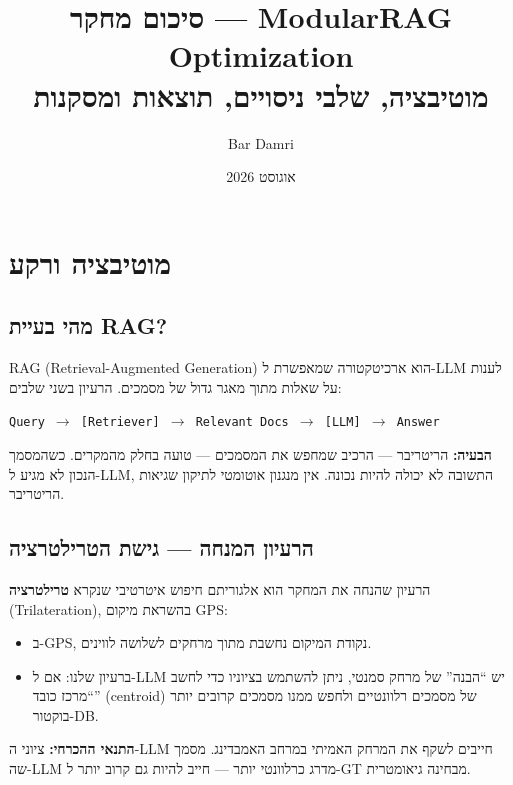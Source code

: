 \documentclass[12pt, a4paper]{article}
\title{%
  \textbf{סיכום מחקר --- ModularRAG Optimization}\\[0.5em]
  \large מוטיבציה, שלבי ניסויים, תוצאות ומסקנות
}
\author{Bar Damri}
\date{אוגוסט 2026}
\begin{document}
\maketitle
\tableofcontents
\newpage

\section{מוטיבציה ורקע}

\subsection{מהי בעיית RAG?}

\textenglish{RAG (Retrieval-Augmented Generation)} הוא ארכיטקטורה שמאפשרת ל-\textenglish{LLM} לענות על שאלות מתוך מאגר גדול של מסמכים. הרעיון בשני שלבים:

\begin{english}
\begin{center}
\texttt{Query\ $\to$\ [Retriever]\ $\to$\ Relevant Docs\ $\to$\ [LLM]\ $\to$\ Answer}
\end{center}
\end{english}

\textbf{הבעיה:} הריטריבר --- הרכיב שמחפש את המסמכים --- טועה בחלק מהמקרים. כשהמסמך הנכון לא מגיע ל-\textenglish{LLM}, התשובה לא יכולה להיות נכונה. אין מנגנון אוטומטי לתיקון שגיאות הריטריבר.

\subsection{הרעיון המנחה --- גישת הטרילטרציה}

הרעיון שהנחה את המחקר הוא אלגוריתם חיפוש איטרטיבי שנקרא \textbf{טרילטרציה} (\textenglish{Trilateration}), בהשראת מיקום \textenglish{GPS}:

\begin{itemize}
  \item ב-\textenglish{GPS}, נקודת המיקום נחשבת מתוך מרחקים לשלושה לווינים.
  \item ברעיון שלנו: אם ל-\textenglish{LLM} יש ``הבנה'' של מרחק סמנטי, ניתן להשתמש בציוניו כדי לחשב ``מרכז כובד'' (\textenglish{centroid}) של מסמכים רלוונטיים ולחפש ממנו מסמכים קרובים יותר בוקטור-\textenglish{DB}.
\end{itemize}

\textbf{התנאי ההכרחי:} ציוני ה-\textenglish{LLM} חייבים לשקף את המרחק האמיתי במרחב האמבדינג. מסמך שה-\textenglish{LLM} מדרג כרלוונטי יותר --- חייב להיות גם קרוב יותר ל-\textenglish{GT} מבחינה גיאומטרית.
\end{document}
